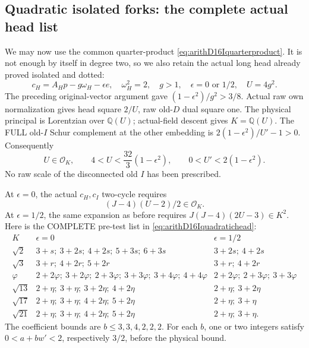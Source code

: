 \documentclass[11pt]{article}
\begin{document}
\subsection{Quadratic isolated forks: the complete actual head list}
\label{app:arithD16Iquadratichead}

We may now use the common
quarter-product
\eqref{eq:arithD16Iquarterproduct}.
It is not enough by itself in
degree two, so we also retain
the actual long head already proved
isolated and dotted:
\[
 c_H=A_Hp-g\omega_H-\epsilon e,\quad
 \omega_H^2=2,\quad g>1,\quad
 \epsilon=0\text{ or }1/2,\quad U=4g^2 .
\]
The preceding original-vector
argument gave
\((1-\epsilon^2)/g^2>3/8\).
Actual raw own normalization gives
head square \(2/U\), raw old-\(D\)
dual square one.
The physical principal is Lorentzian
over \(\mathbb Q(U)\); actual-field
descent gives \(K=\mathbb Q(U)\).
The FULL old-\(I\) Schur complement
at the other embedding is
\(2(1-\epsilon^2)/U'-1>0\).
Consequently
\[
 U\in\mathcal O_K,\qquad
       4<U<{\frac{32}{3}}(1-\epsilon^2),\qquad
       0<U'<2(1-\epsilon^2).
\tag{D16IQhead}\label{eq:arithD16Iquadratichead}
\]
No raw scale of the disconnected
old \(I\) has been prescribed.

At \(\epsilon=0\), the actual
\(c_H,c_I\) two-cycle requires
\[
                              (J-4)(U-2)/2\in\mathcal O_K .
\]
At \(\epsilon=1/2\), the same expansion
as before requires
\(J(J-4)(2U-3)\in K^2\).
Here is the COMPLETE pre-test list
in \eqref{eq:arithD16Iquadratichead}:
\[
\begin{array}{c|l|l}
 K&\epsilon=0&\epsilon=1/2\\ \hline
 \sqrt2&3+s;\ 3+2s;\ 4+2s;\ 5+3s;\ 6+3s&3+2s;\ 4+2s\\
 \sqrt3&3+r;\ 4+2r;\ 5+2r&3+r;\ 4+2r\\
 \varphi&2+2\varphi;\ 3+2\varphi;\ 2+3\varphi;\
       3+3\varphi;\ 3+4\varphi;\ 4+4\varphi&
       2+2\varphi;\ 2+3\varphi;\ 3+3\varphi\\
 \sqrt{13}&2+\eta;\ 3+\eta;\ 3+2\eta;\ 4+2\eta&2+\eta;\ 3+2\eta\\
 \sqrt{17}&2+\eta;\ 3+\eta;\ 4+2\eta;\ 5+2\eta&2+\eta;\ 3+\eta\\
 \sqrt{21}&2+\eta;\ 3+\eta;\ 4+2\eta;\ 5+2\eta&2+\eta;\ 3+\eta .
\end{array}
\]
The coefficient bounds are
\(b\le3,3,4,2,2,2\).
For each \(b\), one or two integers
satisfy \(0<a+bw'<2\), respectively
\(3/2\), before the physical bound.
\end{document}
